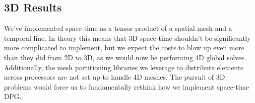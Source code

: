 \documentclass[Dissertation.tex]{subfiles}
\begin{document}
\subsection{3D Results}
We've implemented space-time as a tensor product of a spatial mesh and a temporal line. 
In theory this means that 3D space-time shouldn't be significantly more complicated to implement,
but we expect the costs to blow up even more than they did from 2D to 3D, as we would now be performing
4D global solves.
Additionally, the mesh partitioning libraries we leverage to distribute elements across processors are 
not set up to handle 4D meshes.
The pursuit of 3D problems would force us to fundamentally rethink how we implement space-time DPG.
\end{document}

